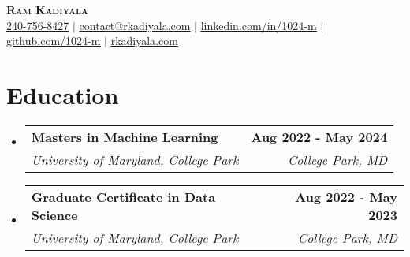 \documentclass[letterpaper,11pt]{article}
\makeatletter
\newcommand{\resumeSubheading}[4]{ \vspace{-3pt}\item \begin{tabular*}{0.97\textwidth}[t]{l@{\extracolsep{\fill}}r} 
   #1 & #2 \\ \textit{\small#3} & \textit{\small #4} \\ \end{tabular*}\vspace{-8pt}}
\newcommand{\resumeSubHeadingListStart}{\begin{itemize}[leftmargin=0.08in, label={}]}
\newcommand{\resumeSubHeadingListEnd}{\end{itemize}}
\makeatother
\begin{document}
\begin{center}
    \textbf{\Huge \scshape \textcolor{myColor1}{Ram Kadiyala}} \\ \vspace{2pt}
    \small
    \faPhone \underline{ 240-756-8427} $|$
    \href{mailto:contact@rkadiyala.com}{\faEnvelope \underline{ contact@rkadiyala.com}} $|$ 
    \href{https://linkedin.com/in/1024-m}{\faLinkedin \underline{ linkedin.com/in/1024-m}} $|$
    \href{https://github.com/1024-m}{ \faGithub \underline{ github.com/1024-m}} $|$
    \href{https://www.rkadiyala.com}{\faGlobe \underline{ rkadiyala.com}}
\end{center}\vspace{-20pt}
\section{\textbf{\textcolor{myColor1}{Education}}}
  \resumeSubHeadingListStart
  \vspace{2pt}
    \resumeSubheading
      {\textbf{Masters in Machine Learning}}{\textbf{Aug 2022 - May 2024}}
      {University of Maryland, College Park}{College Park, MD}\vspace{3pt}
    \resumeSubheading
      {\textbf{Graduate Certificate in Data Science}}{\textbf{Aug 2022 - May 2023}}
      {University of Maryland, College Park}{College Park, MD}
  \resumeSubHeadingListEnd \vspace{-12pt}
\end{document}
